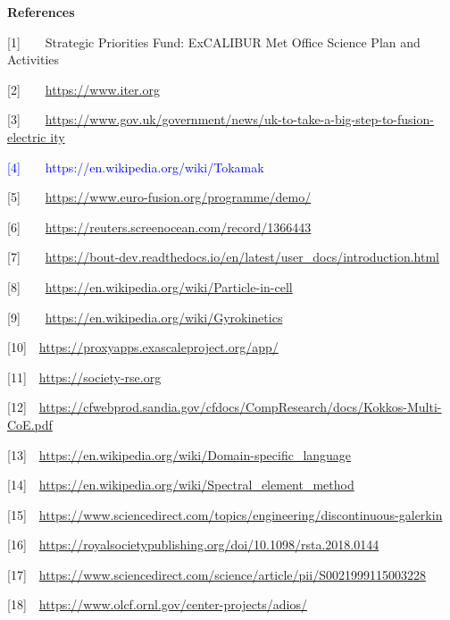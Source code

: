\documentclass[a4paper]{article}
\newcommand\textstyleInternetlink[1]{\textcolor{blue}{#1}}
\begin{document}
\bigskip


\bigskip


\bigskip


\bigskip


\bigskip


\bigskip


\bigskip


\bigskip


\bigskip


\bigskip

\textbf{\textcolor[rgb]{0.12156863,0.28627452,0.49019608}{References}}


\bigskip

{[1]\ \ \ \ }Strategic Priorities Fund: ExCALIBUR Met Office Science Plan and 
Activities

[2]\ \ \ \ \url{https://www.iter.org}

[3]\ \ \ \ 
\url{https://www.gov.uk/government/news/uk-to-take-a-big-step-to-fusion-electric
ity}

\textstyleInternetlink{{[4]}\ \ \ \ https://en.wikipedia.org/wiki/Tokamak}

[5]\ \ \ \ \url{https://www.euro-fusion.org/programme/demo/}

[6]\ \ \ \ \url{https://reuters.screenocean.com/record/1366443}

[7]\ \ \ \ 
\url{https://bout-dev.readthedocs.io/en/latest/user_docs/introduction.html}

[8]\ \ \ \ \url{https://en.wikipedia.org/wiki/Particle-in-cell}

[9]\ \ \ \ \url{https://en.wikipedia.org/wiki/Gyrokinetics}

[10]\ \ \url{https://proxyapps.exascaleproject.org/app/}

[11]\ \ \url{https://society-rse.org}

[12]\ \ 
\url{https://cfwebprod.sandia.gov/cfdocs/CompResearch/docs/Kokkos-Multi-CoE.pdf}

[13]\ \ \url{https://en.wikipedia.org/wiki/Domain-specific_language}

[14]\ \ \url{https://en.wikipedia.org/wiki/Spectral_element_method}

[15]\ \ 
\url{https://www.sciencedirect.com/topics/engineering/discontinuous-galerkin}

[16]\ \ \url{https://royalsocietypublishing.org/doi/10.1098/rsta.2018.0144}

[17]\ \ 
\url{https://www.sciencedirect.com/science/article/pii/S0021999115003228}

[18]\ \ \url{https://www.olcf.ornl.gov/center-projects/adios/}
\end{document}
